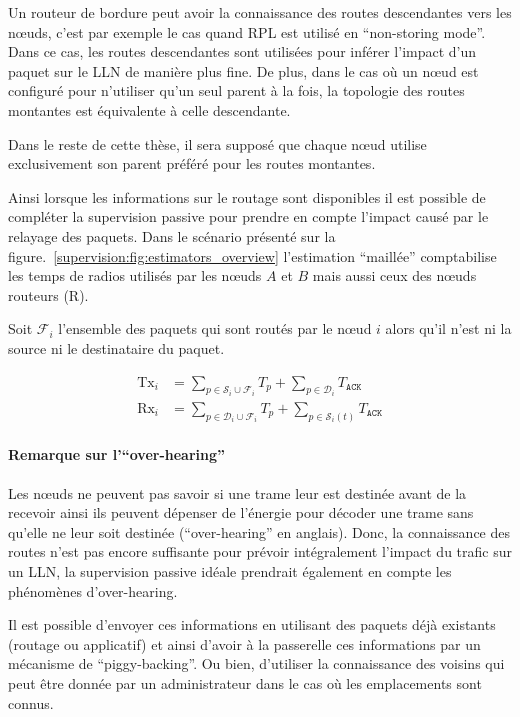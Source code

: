 Un routeur de bordure peut avoir la connaissance des routes descendantes vers les nœuds, c'est par exemple le cas quand \ac{RPL} est utilisé en ``non-storing mode''.
Dans ce cas, les routes descendantes sont utilisées pour inférer l'impact d'un paquet sur le \ac{LLN} de manière plus fine.
De plus, dans le cas où un nœud est configuré pour n'utiliser qu'un seul parent à la fois, la topologie des routes montantes est équivalente à celle descendante.

Dans le reste de cette thèse, il sera supposé que chaque nœud utilise exclusivement son parent préféré pour les routes montantes.


Ainsi lorsque les informations sur le routage sont disponibles il est possible de compléter la supervision passive pour prendre en compte l'impact causé par le relayage des paquets.
Dans le scénario présenté sur la figure.~\ref{supervision:fig:estimators_overview} l'estimation ``maillée'' comptabilise les temps de radios utilisés par les nœuds $A$ et $B$ mais aussi ceux des nœuds routeurs (R).

Soit $\mathcal{F}_i$ l'ensemble des paquets qui sont routés par le nœud $i$ alors qu'il n'est ni la source ni le destinataire du paquet.

\begin{align}
  \textrm{Tx}_i &= \sum_{p \in \mathcal{S}_i \cup \mathcal{F}_i}{T_p}
                      + \sum_{p \in \mathcal{D}_i}{T_{\texttt{ACK}}}\\
  \textrm{Rx}_i &= \sum_{p \in \mathcal{D}_i \cup \mathcal{F}_i}{T_p}
                      + \sum_{p \in \mathcal{S}_i(t)}{T_{\texttt{ACK}}}
\end{align}

\paragraph{Remarque sur l'``over-hearing''}

Les nœuds ne peuvent pas savoir si une trame leur est destinée avant de la recevoir ainsi ils peuvent dépenser de l'énergie pour décoder une trame sans qu'elle ne leur soit destinée (``over-hearing'' en anglais).
Donc, la connaissance des routes n'est pas encore suffisante pour prévoir intégralement l'impact du trafic sur un \ac{LLN}, la supervision passive idéale prendrait également en compte les phénomènes d'over-hearing.

Il est possible d'envoyer ces informations en utilisant des paquets déjà existants (routage ou applicatif) et ainsi d'avoir à la passerelle ces informations par un mécanisme de ``piggy-backing''.
Ou bien, d'utiliser la connaissance des voisins qui peut être donnée par un administrateur dans le cas où les emplacements sont connus.

